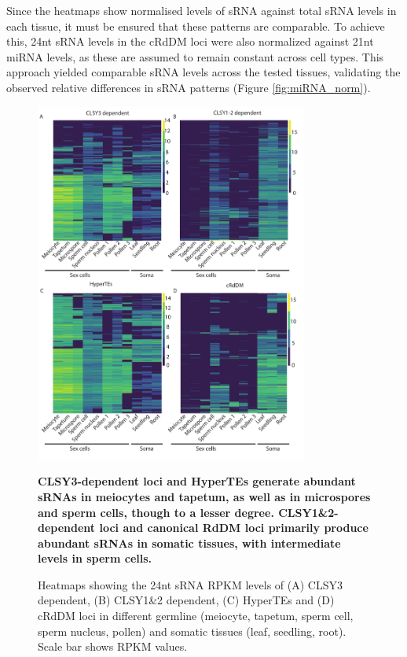 Since the heatmaps show normalised levels of sRNA against total sRNA levels in each tissue, it must be ensured that these patterns are comparable. To achieve this, 24nt sRNA levels in the cRdDM loci were also normalized against 21nt miRNA levels, as these are assumed to remain constant across cell types. This approach yielded comparable sRNA levels across the tested tissues, validating the observed relative differences in sRNA patterns (Figure \ref{fig:miRNA_norm}).

\begin{figure}[htbp!] 
\centering    
    \includegraphics[width=0.8\textwidth]{Chapter2/Figs/Figure8_Heatmaps_CLSY3_CLSY1_2vs_cRdDMs_HyperTEs.pdf}
\caption{\textbf{CLSY3-dependent loci and HyperTEs generate abundant sRNAs in meiocytes and tapetum, as well as in microspores and sperm cells, though to a lesser degree. CLSY1\&2-dependent loci and canonical RdDM loci primarily produce abundant sRNAs in somatic tissues, with intermediate levels in sperm cells.}}
\label{fig:hm_CLSY3_CLSY1}
\captionsetup{font=small}
    \caption*{Heatmaps showing the 24nt sRNA RPKM levels of (A) CLSY3 dependent, (B) CLSY1\&2 dependent, (C) HyperTEs and (D) cRdDM loci in different germline (meiocyte, tapetum, sperm cell, sperm nucleus, pollen) and somatic tissues (leaf, seedling, root). Scale bar shows RPKM values.}
\end{figure}

